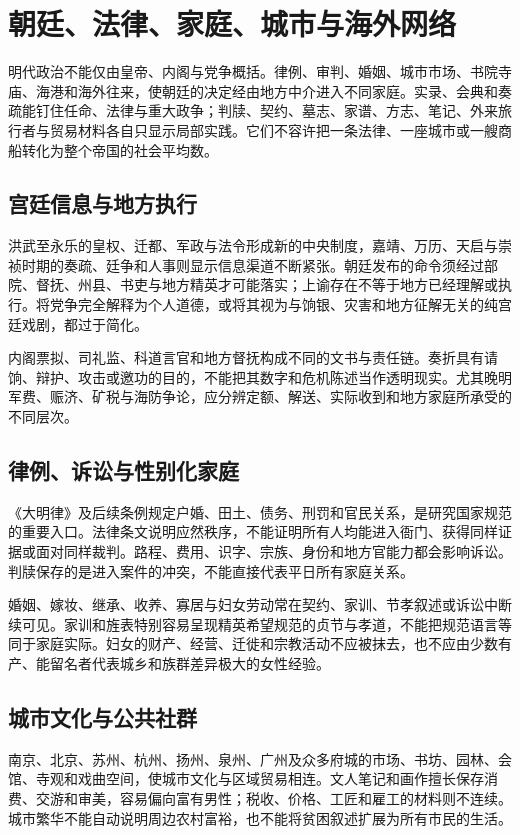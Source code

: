 \section{朝廷、法律、家庭、城市与海外网络}
\label{sec:ming-court-law-family-city-overseas}

明代政治不能仅由皇帝、内阁与党争概括。律例、审判、婚姻、城市市场、书院寺庙、海港和海外往来，使朝廷的决定经由地方中介进入不同家庭。实录、会典和奏疏能钉住任命、法律与重大政争；判牍、契约、墓志、家谱、方志、笔记、外来旅行者与贸易材料各自只显示局部实践。它们不容许把一条法律、一座城市或一艘商船转化为整个帝国的社会平均数。

\subsection{宫廷信息与地方执行}

洪武至永乐的皇权、迁都、军政与法令形成新的中央制度，嘉靖、万历、天启与崇祯时期的奏疏、廷争和人事则显示信息渠道不断紧张。朝廷发布的命令须经过部院、督抚、州县、书吏与地方精英才可能落实；上谕存在不等于地方已经理解或执行。将党争完全解释为个人道德，或将其视为与饷银、灾害和地方征解无关的纯宫廷戏剧，都过于简化。

内阁票拟、司礼监、科道言官和地方督抚构成不同的文书与责任链。奏折具有请饷、辩护、攻击或邀功的目的，不能把其数字和危机陈述当作透明现实。尤其晚明军费、赈济、矿税与海防争论，应分辨定额、解送、实际收到和地方家庭所承受的不同层次。

\subsection{律例、诉讼与性别化家庭}

《大明律》及后续条例规定户婚、田土、债务、刑罚和官民关系，是研究国家规范的重要入口。法律条文说明应然秩序，不能证明所有人均能进入衙门、获得同样证据或面对同样裁判。路程、费用、识字、宗族、身份和地方官能力都会影响诉讼。判牍保存的是进入案件的冲突，不能直接代表平日所有家庭关系。

婚姻、嫁妆、继承、收养、寡居与妇女劳动常在契约、家训、节孝叙述或诉讼中断续可见。家训和旌表特别容易呈现精英希望规范的贞节与孝道，不能把规范语言等同于家庭实际。妇女的财产、经营、迁徙和宗教活动不应被抹去，也不应由少数有产、能留名者代表城乡和族群差异极大的女性经验。

\subsection{城市文化与公共社群}

南京、北京、苏州、杭州、扬州、泉州、广州及众多府城的市场、书坊、园林、会馆、寺观和戏曲空间，使城市文化与区域贸易相连。文人笔记和画作擅长保存消费、交游和审美，容易偏向富有男性；税收、价格、工匠和雇工的材料则不连续。城市繁华不能自动说明周边农村富裕，也不能将贫困叙述扩展为所有市民的生活。

